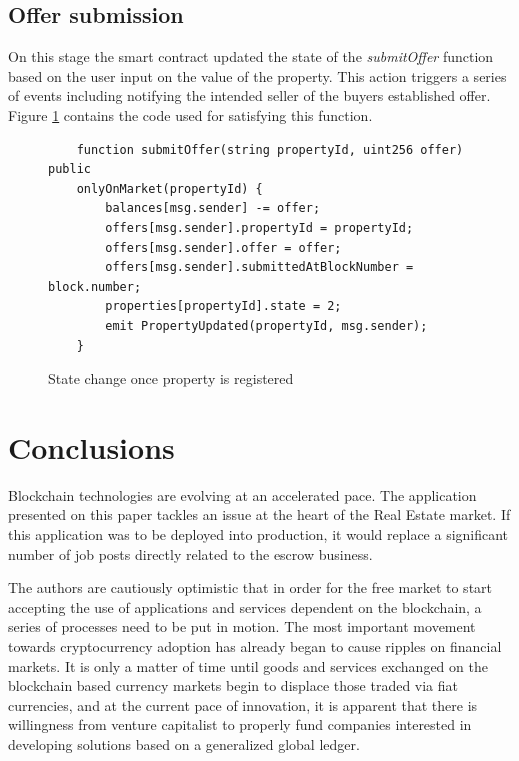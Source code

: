 \documentclass[submission,copyright,creativecommons]{eptcs}
\begin{document}
\subsection{Offer submission}
On this stage the smart contract updated the state of the \textit{submitOffer} function based on the user input on the value of the property.  This action triggers a series of events including notifying the intended seller of the buyers established offer.  Figure \ref{fig:offer_submission_code} contains the code used for satisfying this function.
\begin{figure}[h]
\begin{tcolorbox}
\begin{verbatim}
    function submitOffer(string propertyId, uint256 offer) public
    onlyOnMarket(propertyId) {
        balances[msg.sender] -= offer;
        offers[msg.sender].propertyId = propertyId;
        offers[msg.sender].offer = offer;
        offers[msg.sender].submittedAtBlockNumber = block.number;
        properties[propertyId].state = 2;
        emit PropertyUpdated(propertyId, msg.sender);
    }
\end{verbatim}
\end{tcolorbox}
\caption{State change once property is registered}
\label{fig:offer_submission_code}
\end{figure}

\section{Conclusions}
Blockchain technologies are evolving at an accelerated pace. The application presented on this paper tackles an issue at the heart of the Real Estate market.  If this application was to be deployed into production, it would replace a significant number of job posts directly related to the escrow business.  

The authors are cautiously optimistic that in order for the free market to start accepting the use of applications and services dependent on the blockchain, a series of processes need to be put in motion.  The most important movement towards cryptocurrency adoption has already began to cause ripples on financial markets.  It is only a matter of time until goods and services exchanged on the blockchain based currency markets begin to displace those traded via fiat currencies, and at the current pace of innovation, it is apparent that there is willingness from venture capitalist to properly fund companies interested in developing solutions based on a generalized global ledger. 
\end{document}
